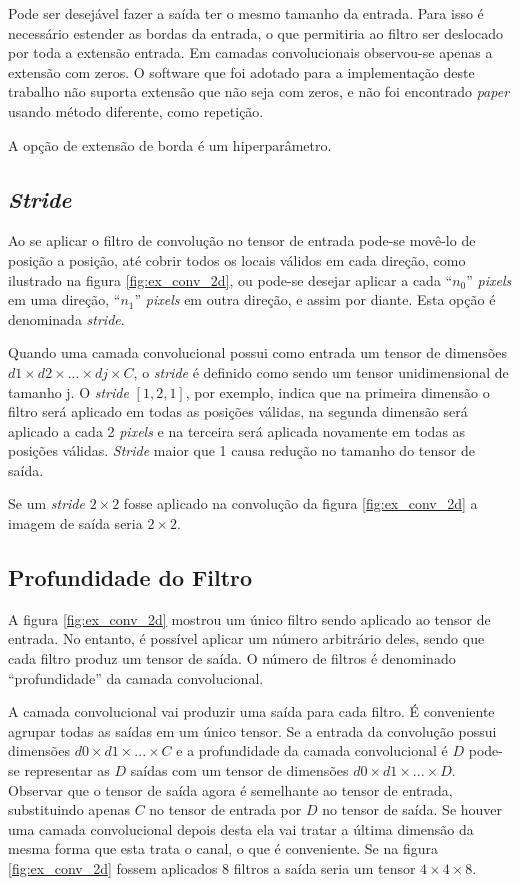 Pode ser
desejável fazer a saída ter o mesmo tamanho da entrada. Para isso é necessário
estender as bordas da entrada, o que permitiria ao filtro ser deslocado por
toda a extensão entrada. Em camadas convolucionais observou-se apenas a
extensão com zeros. O software que foi adotado para a implementação deste
trabalho não suporta extensão que não seja com zeros, e não foi encontrado
\emph{paper} usando método diferente, como repetição.

A opção de extensão de borda é um hiperparâmetro.

\subsection{\emph{Stride}}
Ao se aplicar o filtro de convolução no tensor de entrada pode-se movê-lo de
posição a posição, até cobrir todos os locais válidos em cada direção, como
ilustrado na figura \ref{fig:ex_conv_2d}, ou pode-se desejar aplicar a cada
``$n_0$'' \emph{pixels} em uma direção, ``$n_1$'' \emph{pixels} em outra
direção, e assim por diante.  Esta opção é denominada \emph{stride}.

Quando uma camada convolucional possui como entrada um tensor de dimensões
$d1\times d2 \times ... \times dj \times C$, o \emph{stride} é definido como
sendo um tensor unidimensional de tamanho j.
O \emph{stride} $[1,2,1]$, por exemplo, indica que na primeira dimensão o
filtro será aplicado em todas as posições válidas, na segunda dimensão será
aplicado a cada 2 \emph{pixels} e na terceira será aplicada novamente em
todas as posições válidas. \emph{Stride} maior que 1 causa redução no
tamanho do tensor de saída.

Se um \emph{stride} $2 \times 2$ fosse aplicado na convolução da figura
\ref{fig:ex_conv_2d} a imagem de saída seria $2 \times 2$.

\subsection{Profundidade do Filtro}
A figura \ref{fig:ex_conv_2d} mostrou um único filtro sendo aplicado ao
tensor de entrada. No entanto, é possível aplicar um número arbitrário
deles, sendo que cada filtro produz um tensor de saída. O número de filtros é
denominado ``profundidade'' da camada convolucional.

A camada convolucional vai produzir uma saída para cada filtro. É conveniente
agrupar todas as saídas em um único tensor. Se a entrada da convolução
possui dimensões $d0 \times d1 \times ... \times C$ e a profundidade da camada
convolucional é $D$ pode-se representar as $D$ saídas com um tensor de
dimensões $d0 \times d1 \times ... \times D$. Observar que o tensor de saída
agora é semelhante ao tensor de entrada, substituindo apenas $C$ no tensor de
entrada por $D$ no tensor de saída. Se houver uma camada convolucional depois
desta ela vai tratar a última dimensão da mesma forma que esta trata o canal, o
que é conveniente. Se na figura \ref{fig:ex_conv_2d} fossem aplicados 8
filtros a saída seria um tensor $4 \times 4 \times 8$.

